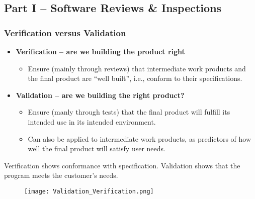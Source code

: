 \documentclass[../ESOF_notes.tex]{subfiles}
\begin{document}
\subsection{Part I – Software Reviews \& Inspections}
\subsubsection{Verification versus Validation}
\begin{itemize}
    \item \textbf{Verification – are we building the product right}
          \begin{itemize}
              \item Ensure (mainly through reviews) that intermediate
                    work products and the final product are “well built”, 
                    i.e., conform to their specifications.
          \end{itemize}
    \item \textbf{Validation – are we building the right product?}
          \begin{itemize}
              \item Ensure (manly through tests) that the final
                    product will fulfill its intended use in its intended 
                    environment.
              \item Can also be applied to intermediate work products,
                    as predictors of how well the final product will satisfy 
                    user needs.
          \end{itemize}
\end{itemize}
Verification shows conformance with specification.
Validation shows that the program meets the customer’s needs.
\begin{figure}[h]
    \centering
    \texttt{[image: Validation\_Verification.png]}
\end{figure}
\end{document}
